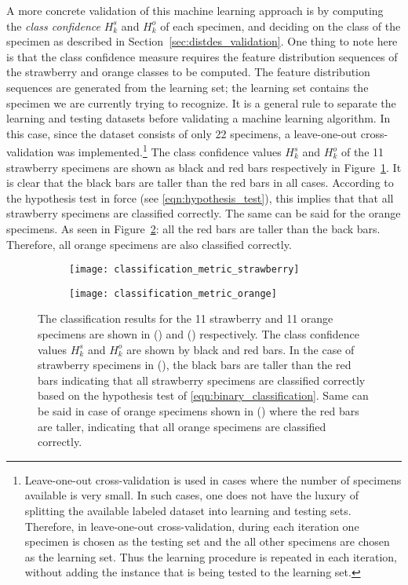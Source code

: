 A more concrete validation of this machine learning approach is by computing the \emph{class confidence} $H^s_k$ and $H^o_k$ of each specimen, and deciding on the class of the specimen as described in Section~\ref{sec:distdes_validation}. One thing to note here is that the class confidence measure requires the feature distribution sequences of the strawberry and orange classes to be computed. The feature distribution sequences are generated from the learning set; the learning set contains the specimen we are currently trying to recognize. It is a general rule to separate the learning and testing datasets before validating a machine learning algorithm. In this case, since the dataset consists of only 22 specimens, a leave-one-out cross-validation \cite{alpaydin} was implemented.\footnote{Leave-one-out cross-validation is used in cases where the number of specimens available is very small. In such cases, one does not have the luxury of splitting the available labeled dataset into 
learning and testing sets. Therefore, in leave-one-out cross-validation, during each iteration one 
specimen is chosen as the testing set and the all other specimens are chosen as the learning set. Thus the learning procedure is repeated in each iteration, without adding the instance that is being tested to the learning set.} The class confidence values $H^s_k$ and $H^o_k$ of the 11 strawberry specimens are shown as black and red bars respectively in Figure~\ref{fig:results_strawberry}. It is clear that the black bars are taller than the red bars in all cases. According to the hypothesis test in force (see \eqref{eqn:hypothesis_test}), this implies that that all strawberry specimens are classified correctly. The same can be said for the orange specimens. As seen in Figure~\ref{fig:results_orange}: all the red bars are taller than the back bars. Therefore, all orange specimens are also classified correctly.

%
\begin{figure*}
  \centering
  \begin{subfigure}[]{0.7\textwidth}
      \texttt{[image: classification\_metric\_strawberry]}
      \caption{}
      \label{fig:results_strawberry}
  \end{subfigure}
  \vskip -2pt
  \begin{subfigure}[]{0.7\textwidth}
      \texttt{[image: classification\_metric\_orange]}
      \caption{}
      \label{fig:results_orange}
  \end{subfigure}
\caption[Classification results]{The classification results for the 11 strawberry and 11 orange specimens are shown in () and () respectively. The class confidence values $H^s_k$ and $H^o_k$ are shown by black and red bars. In the case of strawberry specimens in (), the black bars are taller than the red bars indicating that all strawberry specimens are classified correctly based on the hypothesis test of \eqref{eqn:binary_classification}. Same can be said in case of orange specimens shown in () where the red bars are taller, indicating that all orange specimens are classified correctly.}
\label{fig:results}
\end{figure*}	
%

